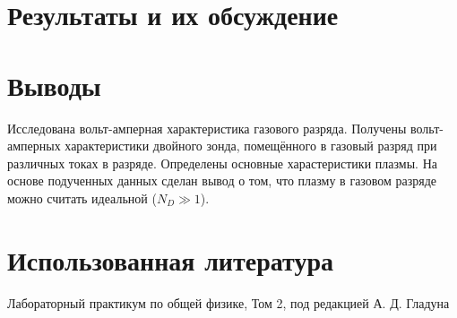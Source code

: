 \documentclass[12pt]{article}
\begin{document}
\section*{Результаты и их обсуждение}

\section*{Выводы}
Исследована вольт-амперная характеристика газового разряда. Получены вольт-амперных характеристики 
двойного зонда, помещённого в газовый разряд при различных токах в разряде. Определены основные харастеристики плазмы. 
На основе подученных данных сделан вывод о том, что плазму в газовом разряде можно считать идеальной ($N_D \gg 1$).


\section*{Использованная литература}
\begin{thebibliography}{9}
	Лабораторный практикум по общей физике, Том 2, под редакцией А. Д. Гладуна
\end{thebibliography}
\end{document}
